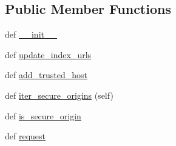 \subsection*{Public Member Functions}
\begin{DoxyCompactItemize}
\item 
def \hyperlink{classpip_1_1__internal_1_1network_1_1session_1_1PipSession_ae83d4a0af975d2db6617e3843efab742}{\+\_\+\+\_\+init\+\_\+\+\_\+}
\item 
def \hyperlink{classpip_1_1__internal_1_1network_1_1session_1_1PipSession_a97c28660d66f6e7b81699c067b39f991}{update\+\_\+index\+\_\+urls}
\item 
def \hyperlink{classpip_1_1__internal_1_1network_1_1session_1_1PipSession_a20718af1079bc016e23aa7cd3ace32fb}{add\+\_\+trusted\+\_\+host}
\item 
def \hyperlink{classpip_1_1__internal_1_1network_1_1session_1_1PipSession_ac1052c24defcfa541b14896d8ec58712}{iter\+\_\+secure\+\_\+origins} (self)
\item 
def \hyperlink{classpip_1_1__internal_1_1network_1_1session_1_1PipSession_a231a4cef3030f81617704a09d7c91211}{is\+\_\+secure\+\_\+origin}
\item 
def \hyperlink{classpip_1_1__internal_1_1network_1_1session_1_1PipSession_a26561b0bcff48b1fc03141c56a1af315}{request}
\end{DoxyCompactItemize}
